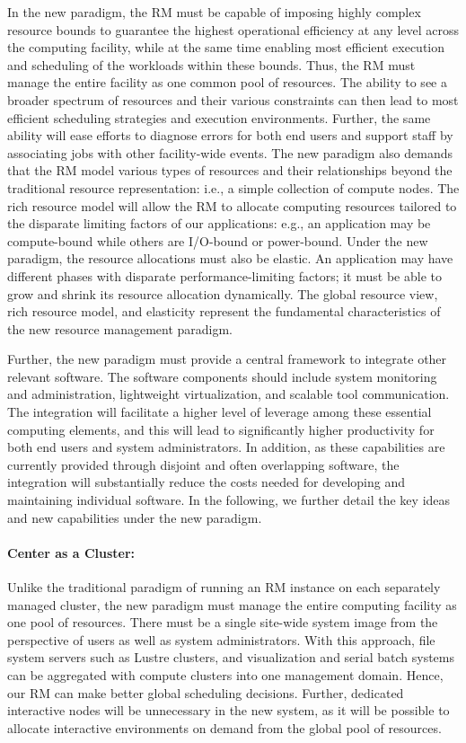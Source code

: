 \documentclass[10pt]{article}
\begin{document}
In the new paradigm, the RM must be capable of imposing highly complex resource bounds
to guarantee the highest operational efficiency at any level
across the computing facility, while at the same time enabling most efficient execution
and scheduling of the workloads within these bounds.
Thus, the RM must manage the entire facility as one
common pool of resources. The ability to see a broader spectrum of resources 
and their various constraints can then lead to most efficient scheduling strategies
and execution environments. Further, the same ability will ease 
efforts to diagnose errors for both end users and support staff
by associating jobs with other facility-wide events. 
The new paradigm also demands that the RM model
various types of resources and their relationships beyond the traditional resource representation:
i.e., a simple collection of compute nodes.
The rich resource model will allow the RM to allocate computing resources
tailored to the disparate limiting factors of our applications: e.g.,
an application may be compute-bound while others are I/O-bound or power-bound.
Under the new paradigm, the resource allocations must also be elastic. 
An application may have different phases with disparate performance-limiting factors;
it must be able to grow and shrink its resource allocation dynamically. 
The global resource view, rich resource model, and elasticity represent
the fundamental characteristics of the new resource management paradigm.

Further, the new paradigm must provide a central framework to integrate
other relevant software. The software components should include   
system monitoring and administration, lightweight virtualization, 
and scalable tool communication. The integration will 
facilitate a higher level of leverage among these essential computing elements, 
and this will lead to significantly higher productivity 
for both end users and system administrators.  
In addition, as these capabilities are currently provided through disjoint
and often overlapping software, the integration will substantially reduce
the costs needed for developing and maintaining individual software.  
In the following, we further detail the key ideas and new capabilities 
under the new paradigm.


\paragraph{Center as a Cluster:}
Unlike the traditional paradigm of running an RM instance on each separately
managed cluster, 
the new paradigm must manage the
entire computing facility as one pool of resources. There must be a single site-wide 
system image from the perspective of users as well as system administrators.
With this approach, file system servers such as Lustre clusters, 
and visualization and serial batch systems can be aggregated
with compute clusters into one management domain. Hence,
our RM can make better global scheduling decisions. 
Further, dedicated interactive nodes will be unnecessary in the new system, as it
will be possible to allocate interactive environments on demand from the
global pool of resources.
\end{document}

